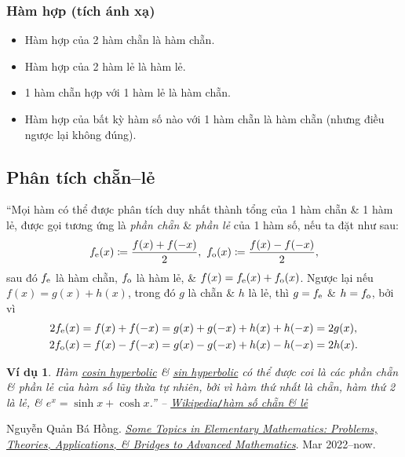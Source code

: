 \documentclass[oneside]{book}
\numberwithin{equation}{section}
\newtheorem{vidu}{Ví dụ}[section]
\begin{document}
\subsubsection{Hàm hợp (tích ánh xạ)}
\begin{itemize}
	\item Hàm hợp của 2 hàm chẵn là hàm chẵn.
	\item Hàm hợp của 2 hàm lẻ là hàm lẻ.
	\item 1 hàm chẵn hợp với 1 hàm lẻ là hàm chẵn.
	\item Hàm hợp của bất kỳ hàm số nào với 1 hàm chẵn là hàm chẵn (nhưng điều ngược lại không đúng).
\end{itemize}

\subsection{Phân tích chẵn--lẻ}
``Mọi hàm có thể được phân tích duy nhất thành tổng của 1 hàm chẵn \& 1 hàm lẻ, được gọi tương ứng là \textit{phần chẵn} \& \textit{phần lẻ} của 1 hàm số, nếu ta đặt như sau:
\begin{align*}
	f_{\rm e}(x)\coloneqq\frac{f(x) + f(-x)}{2},\ f_{\rm o}(x)\coloneqq\frac{f(x) - f(-x)}{2},
\end{align*}
sau đó $f_{\rm e}$ là hàm chẵn, $f_{\rm o}$ là hàm lẻ, \& $f(x) = f_{\rm e}(x) + f_{\rm o}(x)$. Ngược lại nếu $f(x) = g(x) + h(x)$, trong đó $g$ là chẵn \& $h$ là lẻ, thì $g = f_{\rm e}$ \& $h = f_{\rm o}$, bởi vì
\begin{align*}
	2f_{\rm e}(x) &= f(x) + f(-x) = g(x) + g(-x) + h(x) + h(-x) = 2g(x),\\
	2f_{\rm o}(x) &= f(x) - f(-x) = g(x) - g(-x) + h(x) - h(-x) = 2h(x).
\end{align*}

\begin{vidu}
	Hàm \href{https://vi.wikipedia.org/wiki/H%C3%A0m_hyperbolic}{cosin hyperbolic} \& \href{https://vi.wikipedia.org/wiki/H%C3%A0m_hyperbolic}{sin hyperbolic} có thể được coi là các phần chẵn \& phần lẻ của hàm số lũy thừa tự nhiên, bởi vì hàm thứ nhất là chẵn, hàm thứ 2 là lẻ, \& $e^x = \sinh x + \cosh x$.'' -- \href{https://vi.wikipedia.org/wiki/H%C3%A0m_s%E1%BB%91_ch%E1%BA%B5n_v%C3%A0_l%E1%BA%BB}{Wikipedia\emph{\texttt{/}}hàm số chẵn \& lẻ}
\end{vidu}


\begin{thebibliography}{99}
	 Nguyễn Quản Bá Hồng. \href{https://github.com/NQBH/hobby/blob/master/elementary_mathematics/some_topics_in_elementary_mathematics_problems_theories_applications_bridges_to_advanced_mathematics/NQBH_some_topics_in_elementary_mathematics_problems_theories_applications_bridges_to_advanced_mathematics.pdf}{\textit{Some Topics in Elementary Mathematics: Problems, Theories, Applications, \& Bridges to Advanced Mathematics}}. Mar 2022--now.
\end{thebibliography}


\printbibliography[heading=bibintoc]
	
\end{document}
